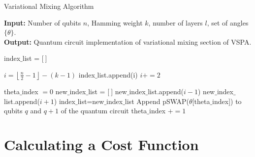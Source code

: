 \documentclass[10pt]{article}
\begin{document}
\begin{algorithm}[H]

\caption{Variational Mixing Algorithm}\label{lphsn}

\hspace*{\algorithmicindent} \textbf{Input:} Number of qubits $n$, Hamming weight $k$, number of layers $l$, set of angles $\{\theta\}$.
\\
\hspace*{\algorithmicindent} \textbf{Output:} Quantum circuit implementation of variational mixing section of VSPA.

\begin{algorithmic}[H]

\State index$\_$list = [$\ $]

\State 

\State $i=\left\lfloor\frac{n}{2}-1\right\rfloor - (k-1)$
    \State index$\_$list.append(i)
    \State $i+=2$
\EndWhile

\State 

\State theta$\_$index $= 0$
        new$\_$index$\_$list = [$\ $]
            \State new$\_$index$\_$list.append($i-1$)
        \EndFor
        \State new$\_$index$\_$list.append($i+1$)
        \State index$\_$list=new$\_$index$\_$list
    \EndIf
            \State Append pSWAP($\theta$[theta$\_$index]) to qubits $q$ and $q+1$ of the quantum circuit
            \State theta$\_$index $+=1$
        \EndIf
    \EndFor
\EndFor

\end{algorithmic}

\end{algorithm}

\section{Calculating a Cost Function}
\end{document}
